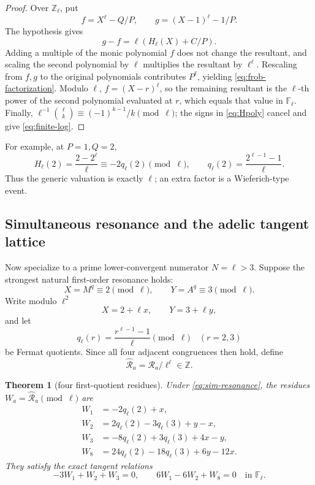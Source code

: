 \documentclass[11pt]{article}
\newtheorem{theorem}{Theorem}[section]
\theoremstyle{definition}
\theoremstyle{remark}
\newcommand{\ZZ}{\mathbb Z}
\newcommand{\FF}{\mathbb F}
\begin{document}
\begin{proof}
Over \(\ZZ_\ell\), put
\[
f=X^\ell-Q/P,\qquad g=(X-1)^\ell-1/P.
\]
The hypothesis gives
\[
g-f=\ell\left(H_\ell(X)+C/P\right).
\]
Adding a multiple of the monic polynomial \(f\) does not change the resultant, and scaling the second polynomial by \(\ell\) multiplies the resultant by \(\ell^\ell\).  Rescaling from \(f,g\) to the original polynomials contributes \(P^\ell\), yielding \eqref{eq:frob-factorization}.  Modulo \(\ell\),
\(f=(X-r)^\ell\), so the remaining resultant is the \(\ell\)-th power of the second polynomial evaluated at \(r\), which equals that value in \(\FF_\ell\).  Finally,
\(\ell^{-1}\binom\ell k\equiv(-1)^{k-1}/k\pmod\ell\); the signs in \eqref{eq:Hpoly} cancel and give \eqref{eq:finite-log}.
\end{proof}

For example, at \(P=1,Q=2\),
\[
H_\ell(2)=\frac{2-2^\ell}{\ell}
\equiv-2q_\ell(2)\pmod\ell,
\qquad q_\ell(2)=\frac{2^{\ell-1}-1}{\ell}.
\]
Thus the generic valuation is exactly \(\ell\); an extra factor is a Wieferich-type event.

\subsection{Simultaneous resonance and the adelic tangent lattice}
Now specialize to a prime lower-convergent numerator \(N=\ell>3\).  Suppose the strongest natural first-order resonance holds:
\begin{equation}\label{eq:sim-resonance}
X=M^q\equiv2\pmod\ell,
\qquad Y=A^q\equiv3\pmod\ell.
\end{equation}
Write modulo \(\ell^2\)
\[
X=2+\ell x,
\qquad Y=3+\ell y,
\]
and let
\[
q_\ell(r)=\frac{r^{\ell-1}-1}{\ell}\pmod\ell
\quad(r=2,3)
\]
be Fermat quotients.  Since all four adjacent congruences then hold, define
\[
\widehat{\mathscr R}_a=\mathscr R_a/\ell^\ell\in\ZZ.
\]

\begin{theorem}[four first-quotient residues]\label{thm:Wtable}
Under \eqref{eq:sim-resonance}, the residues
\(W_a=\widehat{\mathscr R}_a\pmod\ell\) are
\begin{align}
W_1&=-2q_\ell(2)+x,\label{eq:W1}\\
W_2&=2q_\ell(2)-3q_\ell(3)+y-x,\label{eq:W2}\\
W_3&=-8q_\ell(2)+3q_\ell(3)+4x-y,\label{eq:W3}\\
W_8&=24q_\ell(2)-18q_\ell(3)+6y-12x.
\label{eq:W8}
\end{align}
They satisfy the exact tangent relations
\begin{equation}\label{eq:Wrelations}
-3W_1+W_2+W_3=0,
\qquad
6W_1-6W_2+W_8=0
\quad\text{in }\FF_\ell.
\end{equation}
\end{theorem}
\end{document}
